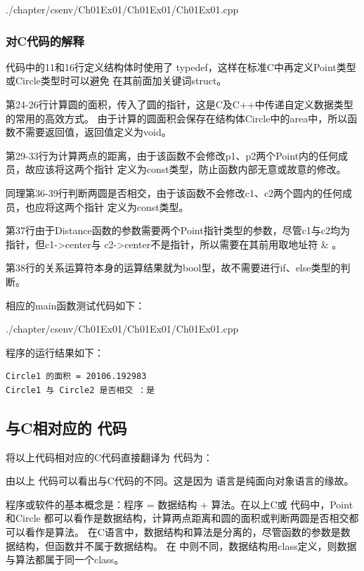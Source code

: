 
        {./chapter/csenv/Ch01Ex01/Ch01Ex01/Ch01Ex01.cpp}

\subsubsection{对C代码的解释}
代码中的11和16行定义结构体时使用了 typedef，这样在标准C中再定义Point类型或Circle类型时可以避免
在其前面加关键词struct。

第24-26行计算圆的面积，传入了圆的指针，这是C及C++中传递自定义数据类型的常用的高效方式。
由于计算的圆面积会保存在结构体Circle中的area中，所以函数不需要返回值，返回值定义为void。

第29-33行为计算两点的距离，由于该函数不会修改p1、p2两个Point内的任何成员，故应该将这两个指针
定义为const类型，防止函数内部无意或故意的修改。

同理第36-39行判断两圆是否相交，由于该函数不会修改c1、c2两个圆内的任何成员，也应将这两个指针
定义为const类型。

第37行由于Distance函数的参数需要两个Point指针类型的参数，尽管c1与c2均为指针，但c1->center与
c2->center不是指针，所以需要在其前用取地址符 \& 。

第38行的关系运算符本身的运算结果就为bool型，故不需要进行if、else类型的判断。

相应的main函数测试代码如下：


{./chapter/csenv/Ch01Ex01/Ch01Ex01/Ch01Ex01.cpp}

程序的运行结果如下：
\begin{verbatim}
Circle1 的面积 = 20106.192983
Circle1 与 Circle2 是否相交 ：是
\end{verbatim}


\subsection{与C相对应的 \cs 代码}

将以上代码相对应的C代码直接翻译为 \cs 代码为：



由以上 \cs 代码可以看出与C代码的不同。这是因为 \cs 语言是纯面向对象语言的缘故。

程序或软件的基本概念是：程序 = 数据结构 + 算法。在以上C或 \cs 代码中，Point和Circle
都可以看作是数据结构，计算两点距离和圆的面积或判断两圆是否相交都可以看作是算法。
在C语言中，数据结构和算法是分离的，尽管函数的参数是数据结构，但函数并不属于数据结构。
在 \cs 中则不同，数据结构用class定义，则数据与算法都属于同一个class。

